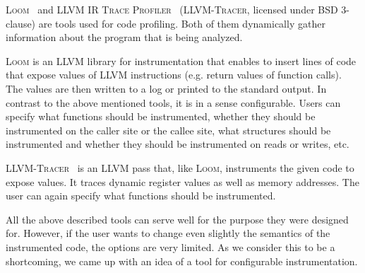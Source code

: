 \textsc{Loom}~\cite{loom} and \textsc{LLVM IR Trace Profiler}~\cite{tracer}
(\textsc{LLVM-Tracer}, licensed under BSD 3-clause) are tools used for code
profiling. Both of them dynamically gather information about the program that
is being analyzed.

\textsc{Loom} is an LLVM library for instrumentation that enables to insert
lines of code that expose values of LLVM instructions (e.g. return values of
function calls). The values are then written to a log or printed to the
standard output. In contrast to the above mentioned tools, it is in a sense
configurable. Users can specify what functions should be instrumented, whether
they should be instrumented on the caller site or the callee site, what
structures should be instrumented and whether they should be instrumented on
reads or writes, etc.

\textsc{LLVM-Tracer}~\cite{tracer} is an LLVM pass that, like \textsc{Loom},
instruments the given code to expose values. It traces dynamic register values
as well as memory addresses. The user can again specify what functions should
be instrumented.

All the above described tools can serve well for the purpose they were designed
for. However, if the user wants to change even slightly the semantics of the
instrumented code, the options are very limited. As we consider this to be
a shortcoming, we came up with an idea of a tool for configurable
instrumentation.
